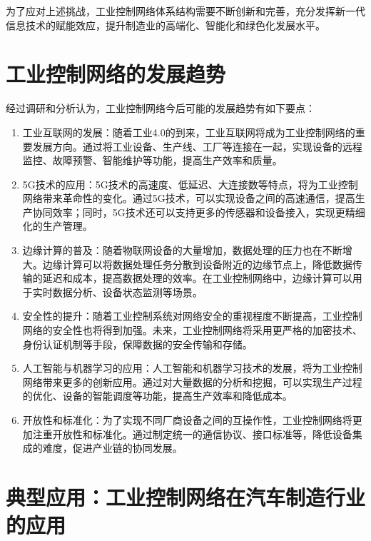 \documentclass[UTF8]{article}
\begin{document}
为了应对上述挑战，工业控制网络体系结构需要不断创新和完善，充分发挥新一代信息技术的赋能效应，提升制造业的高端化、智能化和绿色化发展水平。

%
\section{工业控制网络的发展趋势}

经过调研和分析认为，工业控制网络今后可能的发展趋势有如下要点：

\begin{enumerate}
	\item 工业互联网的发展：随着工业4.0的到来，工业互联网将成为工业控制网络的重要发展方向。通过将工业设备、生产线、工厂等连接在一起，实现设备的远程监控、故障预警、智能维护等功能，提高生产效率和质量。
	\item 5G技术的应用：5G技术的高速度、低延迟、大连接数等特点，将为工业控制网络带来革命性的变化。通过5G技术，可以实现设备之间的高速通信，提高生产协同效率；同时，5G技术还可以支持更多的传感器和设备接入，实现更精细化的生产管理。
	\item 边缘计算的普及：随着物联网设备的大量增加，数据处理的压力也在不断增大。边缘计算可以将数据处理任务分散到设备附近的边缘节点上，降低数据传输的延迟和成本，提高数据处理的效率。在工业控制网络中，边缘计算可以用于实时数据分析、设备状态监测等场景。
	\item 安全性的提升：随着工业控制系统对网络安全的重视程度不断提高，工业控制网络的安全性也将得到加强。未来，工业控制网络将采用更严格的加密技术、身份认证机制等手段，保障数据的安全传输和存储。
	\item 人工智能与机器学习的应用：人工智能和机器学习技术的发展，将为工业控制网络带来更多的创新应用。通过对大量数据的分析和挖掘，可以实现生产过程的优化、设备的智能调度等功能，提高生产效率和降低成本。
	\item 开放性和标准化：为了实现不同厂商设备之间的互操作性，工业控制网络将更加注重开放性和标准化。通过制定统一的通信协议、接口标准等，降低设备集成的难度，促进产业链的协同发展。
\end{enumerate}

%
\section{典型应用：工业控制网络在汽车制造行业的应用}
\end{document}
